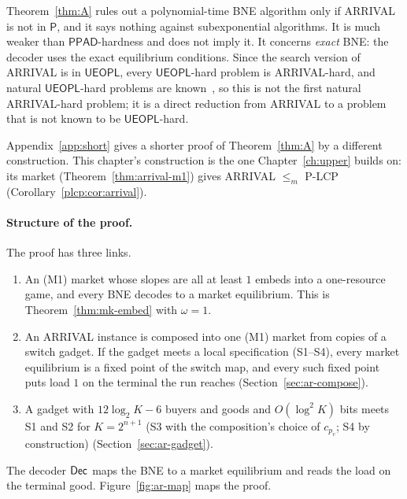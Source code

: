 Theorem~\ref{thm:A} rules out a polynomial-time BNE algorithm only if ARRIVAL is not in $\mathsf P$, and
it says nothing against subexponential algorithms. It is much weaker than $\mathsf{PPAD}$-hardness and does not imply it. It
concerns \emph{exact} BNE: the decoder uses the exact equilibrium conditions. Since the search version of ARRIVAL is in
$\mathsf{UEOPL}$, every $\mathsf{UEOPL}$-hard problem is ARRIVAL-hard, and natural $\mathsf{UEOPL}$-hard problems are
known~\cite{hmr26}, so this is not the first natural ARRIVAL-hard problem; it is a direct reduction
from ARRIVAL to a problem that is not known to be $\mathsf{UEOPL}$-hard.

Appendix~\ref{app:short} gives a shorter proof of Theorem~\ref{thm:A} by a different construction. This chapter's construction is the one Chapter~\ref{ch:upper} builds on: its market (Theorem~\ref{thm:arrival-m1}) gives ARRIVAL $\le_m$ P-LCP (Corollary~\ref{plcp:cor:arrival}).

\paragraph{Structure of the proof.} The proof has three links.
\begin{enumerate}[nosep]
\item An (M1) market whose slopes are all at least $1$ embeds into a one-resource game, and every BNE
decodes to a market equilibrium. This is Theorem~\ref{thm:mk-embed} with $\omega=1$.
\item An ARRIVAL instance is composed into one (M1) market from copies of a switch gadget. If the gadget
meets a local specification (S1--S4), every market equilibrium is a fixed point of the switch map, and
every such fixed point puts load $1$ on the terminal the run reaches (Section~\ref{sec:ar-compose}).
\item A gadget with $12\log_2K-6$ buyers and goods and $O(\log^2K)$ bits meets S1 and S2 for $K=2^{n+1}$ (S3 with the composition's choice of $c_{p_v}$; S4 by construction)
(Section~\ref{sec:ar-gadget}).
\end{enumerate}
The decoder $\mathsf{Dec}$ maps the BNE to a market equilibrium and reads the load on the \yes{} terminal good. Figure~\ref{fig:ar-map} maps the proof.

